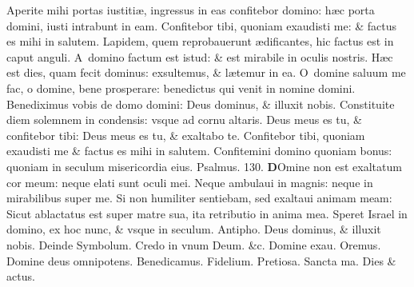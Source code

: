 \documentclass[a5paper,10pt]{book}
\def\ae{æ}
\begin{document}
\begin{multicols*}{2}
\newline \color{red} A\color{black}perite mihi portas iustiti\ae , ingressus in eas confitebor domino: h\ae c porta domini, iusti intrabunt in eam.
\newline \color{red} C\color{black}onfitebor tibi, quoniam exaudisti me: \& factus es mihi in salutem.
\newline \color{red} L\color{black}apidem, quem reprobauerunt \ae dificantes, hic factus est in caput anguli.
\newline \color{red} A\color{black}\ domino factum est istud: \& est mirabile in oculis nostris.
\newline \color{red} H\color{black}\ae c est dies, quam fecit dominus: exsultemus, \& l\ae temur in ea.
\newline \color{red} O\color{black}\ domine saluum me fac, o domine, bene prosperare: benedictus qui venit in nomine domini.
\newline \color{red} B\color{black}enediximus vobis de domo domini: Deus dominus, \& illuxit nobis.
\newline \color{red} C\color{black}onstituite diem solemnem in condensis: vsque ad cornu altaris.
\newline \color{red} D\color{black}eus meus es tu, \& confitebor tibi: Deus meus es tu, \& exaltabo te.
\newline \color{red} C\color{black}onfitebor tibi, quoniam exaudisti me \& factus es mihi in salutem.
\newline \color{red} C\color{black}onfitemini domino quoniam bonus: quoniam in seculum misericordia eius.
\newline \color{red} Psalmus. 130. \color{black}
\lettrine[lines=2]{\bfseries \color{red} D}{}Omine non est exaltatum cor meum: neque elati sunt oculi mei.
\newline \color{red} N\color{black}eque ambulaui in magnis: neque in mirabilibus super me.
\newline \color{red} S\color{black}i non humiliter sentiebam, sed exaltaui animam meam:
\newline \color{red} S\color{black}icut ablactatus est super matre sua, ita retributio in anima mea.
\newline \color{red} S\color{black}peret Israel in domino, ex hoc nunc, \& vsque in seculum.
\newline \color{red} Antipho. \color{black} Deus dominus, \& illuxit nobis. \color{red} Deinde Symbolum. \color{black} Credo in vnum Deum. \&c. Domine exau. Oremus. Domine deus omnipotens. Benedicamus. Fidelium. Pretiosa. Sancta ma. Dies \& actus.

\end{multicols*}
\end{document}
